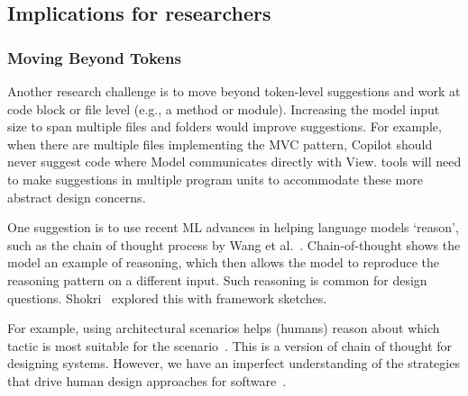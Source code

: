 \subsection{Implications for researchers}
\subsubsection{Moving Beyond Tokens}
Another research challenge is to move beyond token-level suggestions and work at code block or file level (e.g., a method or module). 
Increasing the model input size to span multiple files and folders would improve suggestions. For example, when there are multiple files implementing the MVC pattern, Copilot should never suggest code where \textsf{Model} communicates directly with \textsf{View}. 
\AISE{} tools will need to make suggestions in multiple program units to accommodate these more abstract design concerns.

One suggestion is to use recent ML advances in helping language models `reason', such as the chain of thought process by Wang et al.~\cite{chain_of_thought}. 
Chain-of-thought shows the model an example of reasoning, which then allows the model to reproduce the reasoning pattern on a different input.
Such reasoning is common for design questions. 
Shokri~\cite{shokri21} explored this with framework sketches.

For example, using architectural scenarios helps (humans) reason about which tactic is most suitable for the scenario~\cite{kazman98}. This is a version of chain of thought for designing systems. 
However, we have an imperfect understanding of the strategies that drive human design approaches for software~\cite{Arab2022}. 